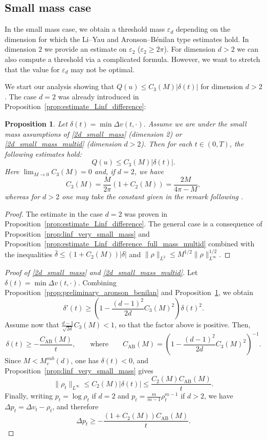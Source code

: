 \documentclass[11pt,a4paper]{article}
\numberwithin{equation}{section}
\theoremstyle{plain}
\newtheorem{proposition}[theorem]{Proposition}
\theoremstyle{remark}
\newcommand {\f}{\frac}
\begin{document}
\subsection{Small mass case}
In the small mass case, we obtain a threshold mass $\varepsilon_d$ depending on the dimension for which the Li--Yau and Aronson--B\'enilan type estimates hold. In dimension $2$ we provide an estimate on $\varepsilon_2$ ($\varepsilon_2\ge 2\pi$). For dimension $d>2$ we can also compute a threshold via a complicated formula. However, we want to stretch that the value for $\varepsilon_d$ may not be optimal.

We start our analysis showing that $Q(u) \leq C_3(M)|\delta(t)|$ for dimension $d>2$. The case $d=2$ was already introduced in Proposition~\ref{prop:estimate_Linf_difference}:

\begin{proposition}\label{prop:split_cases_smallmass}
Let $\delta(t)= \min\Delta v(t,\cdot)$. Assume we are under the small mass assumptions of \ref{2d_small_mass} (dimension 2) or \ref{2d_small_mass_multid} (dimension $d>2$). Then for each $t\in(0,T)$, the following estimates hold:
$$Q(u)\leq C_{3}(M)\left|\delta(t)\right|.$$
Here $\lim_{M\to 0}C_3(M)=0$ and, if $d=2$, we have
$$C_3(M)=\f{M}{2\pi}(1+C_2(M))=\frac{2M}{4\pi-M},$$ whereas for $d>2$ one may take the constant given in the remark following .
\end{proposition}
\begin{proof}
The estimate in the case $d=2$ was proven in Proposition~\ref{prop:estimate_Linf_difference}. The general case is a consequence of Proposition~\ref{prop:linf_very_small_mass} and Proposition~\ref{prop:estimate_Linf_difference_full_mass_multid} combined with the inequalities $\bar{\delta}\le(1+C_2(M))|\delta|$ and $\|\rho\|_{L^{2}}\le M^{1/2}\|\rho\|_{L^{\infty}}^{1/2}$.
\end{proof}

\begin{proof}[Proof of \ref{2d_small_mass} and \ref{2d_small_mass_multid}]
Let $\delta(t)=\min\Delta v(t,\cdot)$. Combining Proposition~\ref{prop:preliminary_aronson_benilan} and Proposition~\ref{prop:split_cases_smallmass}, we obtain
$$
\delta'(t)\ge\left(1-\f{(d-1)^2}{2d}C_3(M)^2\right)\delta(t)^2.
$$
Assume now that $\f{d-1}{\sqrt{2d}}C_3(M)<1$, so that the factor above is positive. Then,
$$
\delta(t)\ge-\f{C_{\mathrm{AB}}(M)}{t},
\qquad\text{where}\qquad
C_{\mathrm{AB}}(M)=\left(1-\f{(d-1)^2}{2d}C_3(M)^2\right)^{-1}.
$$
Since $M<M^{sub}_c(d)$, one has $\delta(t)<0$, and Proposition~\ref{prop:linf_very_small_mass} gives
$$
\|\rho_t\|_{L^\infty}\le C_2(M)|\delta(t)|\le\f{C_2(M)C_{\mathrm{AB}}(M)}{t}.
$$
Finally, writing $p_t=\log\rho_t$ if $d=2$ and $p_t=\f{m}{m-1}\rho_t^{m-1}$ if $d>2$, we have $\Delta p_t=\Delta v_t-\rho_t$, and therefore
$$
\Delta p_t\ge-\f{(1+C_2(M))C_{\mathrm{AB}}(M)}{t}.
$$
\end{proof}
\end{document}
